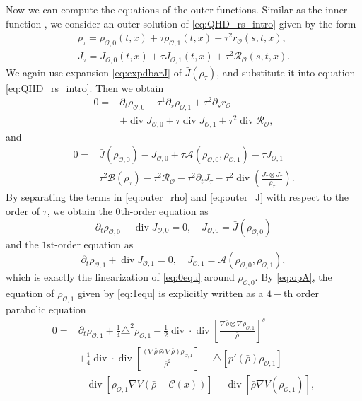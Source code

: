 \documentclass[english]{amsart}
\theoremstyle{plain}
\theoremstyle{definition}
\theoremstyle{remark}
\theoremstyle{plain}
\theoremstyle{plain}
\theoremstyle{plain}
\def\d{{\partial}}
\DeclareMathOperator{\diver}{div}
\numberwithin{equation}{section}
\begin{document}
Now we can compute the equations of the outer functions. Similar as the inner function , we consider an outer solution of \ref{eq:QHD_rs_intro} given by the form
\begin{align*}
\rho_\tau=\rho_{\mathcal{O},0}(t,x)+\tau\rho_{\mathcal{O},1}(t,x)+\tau^2 r_{\mathcal{O}}(s,t,x),\\
J_\tau=J_{\mathcal{O},0}(t,x)+\tau J_{\mathcal{O},1}(t,x)+\tau^2 \mathcal{R}_{\mathcal{O}}(s,t,x).
\end{align*}
We again use expansion \eqref{eq:expdbarJ} of $\bar J(\rho_\tau)$, and substitute it into equation \eqref{eq:QHD_rs_intro}. Then we obtain
\begin{equation}\label{eq:outer_rho}
\begin{aligned}
0=&\d_t\rho_{\mathcal{O},0}+\tau^{1}\d_s\rho_{\mathcal{O},1}+\tau^{2}\d_s r_{\mathcal{O}}\\
&+\diver J_{\mathcal{O},0}+\tau\diver J_{\mathcal{O},1}+\tau^{2}\diver \mathcal{R}_\mathcal{O},
\end{aligned}
\end{equation}
and
\begin{equation}\label{eq:outer_J}
\begin{aligned}
0=&\bar J(\rho_{\mathcal{O},0})-J_{\mathcal{O},0}+\tau \mathcal{A}(\rho_{\mathcal{O},0},\rho_{\mathcal{O},1})-\tau J_{\mathcal{O},1}\\
&\tau^2\mathcal{B}(\rho_\tau)-\tau^2\mathcal{R}_\mathcal{O}-\tau^2\d_tJ_\tau-\tau^2\diver\left(\frac{J_\tau\otimes J_\tau}{\rho_\tau}\right).
\end{aligned}
\end{equation}
By separating the terms in \eqref{eq:outer_rho} and \eqref{eq:outer_J} with respect to the order of $\tau$, we obtain the $0$th-order equation as
\begin{equation}\label{eq:0equ}
\d_t\rho_{\mathcal{O},0}+\diver J_{\mathcal{O},0}=0,\quad J_{\mathcal{O},0}=\bar J(\rho_{\mathcal{O},0})
\end{equation}
and the $1$st-order equation as
\begin{equation}\label{eq:1equ}
\d_t\rho_{\mathcal{O},1}+\diver J_{\mathcal{O},1}=0,\quad J_{\mathcal{O},1}=\mathcal{A}(\rho_{\mathcal{O},0},\rho_{\mathcal{O},1}),
\end{equation}
which is exactly the linearization of \eqref{eq:0equ} around $\rho_{\mathcal{O},0}$. 
By \eqref{eq:opA}, the equation of $\rho_{\mathcal{O},1}$ given by \eqref{eq:1equ} is explicitly written as a $4-$th order parabolic equation
\begin{equation}\label{eq:rho1}
\begin{aligned}
0=&\d_t\rho_{\mathcal{O},1}+\frac14\triangle^2\rho_{\mathcal{O},1}-\frac12\diver\cdot\diver\left[\frac{\nabla \bar\rho\otimes\nabla\rho_{\mathcal{O},1}}{\bar\rho}\right]^s\\
&+\frac14\diver\cdot\diver\left[\frac{(\nabla \bar\rho\otimes\nabla\bar\rho)\rho_{\mathcal{O},1}}{\bar\rho^2}\right]-\triangle [p'(\bar\rho)\rho_{\mathcal{O},1}]\\
&-\diver[\rho_{\mathcal{O},1}\nabla V(\bar\rho-\mathcal{C}(x))]-\diver[\bar\rho\nabla V(\rho_{\mathcal{O},1})],
\end{aligned}
\end{equation}
\end{document}
